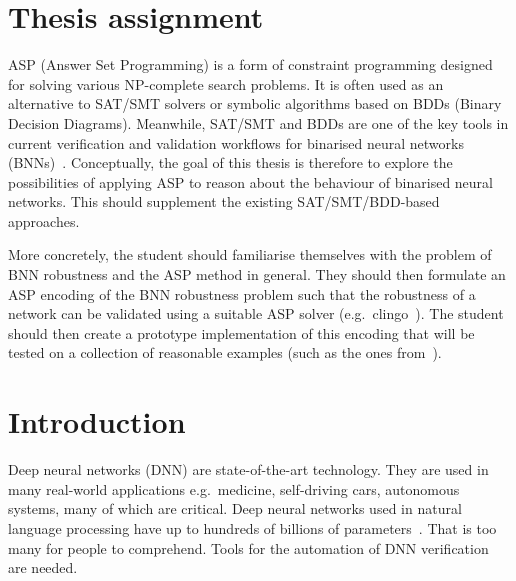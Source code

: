 \documentclass[
    digital,
    color,
    oneside,
    sansbold,
    lot,
    nolof
]{fithesis}
\begin{document}
\chapter*{Thesis assignment}

ASP (Answer Set Programming) is a form of constraint programming designed
for solving various NP-complete search problems. It is often used
as an alternative to SAT/SMT solvers or symbolic algorithms based on BDDs
(Binary Decision Diagrams). Meanwhile, SAT/SMT and BDDs are one of the key
tools in current verification and validation workflows for binarised
neural networks (BNNs)~\cite{zhang2021bdd4bnn}. Conceptually, the goal of this thesis is therefore
to explore the possibilities of applying ASP to reason about the behaviour
of binarised neural networks. This should supplement the existing
SAT/SMT/BDD-based approaches.

More concretely, the student should familiarise themselves with the problem
of BNN robustness and the ASP method in general. They should then formulate
an ASP encoding of the BNN robustness problem such that the robustness of
a network can be validated using a suitable ASP solver (e.g.\ clingo~\cite{gebser2019multi}).
The student should then create a prototype implementation of this encoding
that will be tested on a collection of reasonable examples
(such as the ones from~\cite{zhang2021bdd4bnn}).

\chapter{Introduction}


Deep neural networks (DNN) are state-of-the-art technology. They are used in many
real-world applications e.g.\ medicine, self-driving cars, autonomous systems,
many of which are critical. %
Deep neural networks used in natural language processing have up to hundreds of
billions of parameters~\cite{2021arXiv210901652W}.
That is too many for people to comprehend. Tools for the automation
of DNN verification are needed.
\end{document}
